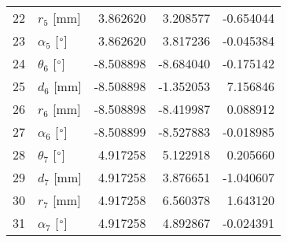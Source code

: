 \documentclass{standalone}%
\begin{document}
\begin{tabular}{llrrr}
22 &              $r_{5}$ [mm] &  3.862620 &   3.208577 &  -0.654044 \\
23 &  $\alpha_{5}$ [$\degree$] &  3.862620 &   3.817236 &  -0.045384 \\
24 &  $\theta_{6}$ [$\degree$] & -8.508898 &  -8.684040 &  -0.175142 \\
25 &              $d_{6}$ [mm] & -8.508898 &  -1.352053 &   7.156846 \\
26 &              $r_{6}$ [mm] & -8.508898 &  -8.419987 &   0.088912 \\
27 &  $\alpha_{6}$ [$\degree$] & -8.508899 &  -8.527883 &  -0.018985 \\
28 &  $\theta_{7}$ [$\degree$] &  4.917258 &   5.122918 &   0.205660 \\
29 &              $d_{7}$ [mm] &  4.917258 &   3.876651 &  -1.040607 \\
30 &              $r_{7}$ [mm] &  4.917258 &   6.560378 &   1.643120 \\
31 &  $\alpha_{7}$ [$\degree$] &  4.917258 &   4.892867 &  -0.024391 \\
\bottomrule
\end{tabular}
%
\end{document}
